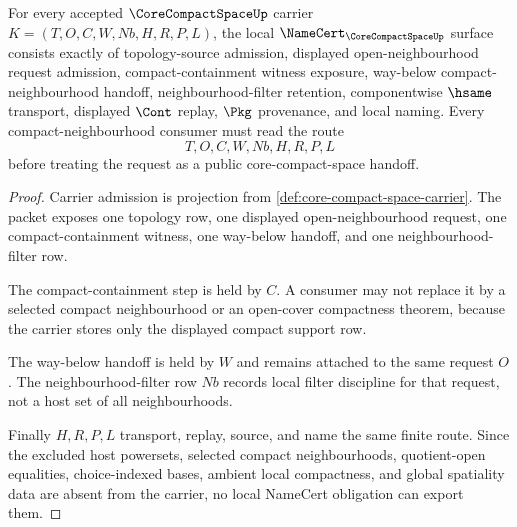 \begin{theorem}
\label{thm:core-compact-space-namecert-obligations}
For every accepted $\CoreCompactSpaceUp$ carrier $K=(T,O,C,W,Nb,H,R,P,L)$, the local $\NameCert_{\CoreCompactSpaceUp}$ surface consists exactly of topology-source admission, displayed open-neighbourhood request admission, compact-containment witness exposure, way-below compact-neighbourhood handoff, neighbourhood-filter retention, componentwise $\hsame$ transport, displayed $\Cont$ replay, $\Pkg$ provenance, and local naming. Every compact-neighbourhood consumer must read the route
$$
T,O,C,W,Nb,H,R,P,L
$$
before treating the request as a public core-compact-space handoff.
\end{theorem}
\begin{proof}
Carrier admission is projection from \autoref{def:core-compact-space-carrier}. The packet exposes one topology row, one displayed open-neighbourhood request, one compact-containment witness, one way-below handoff, and one neighbourhood-filter row.

The compact-containment step is held by $C$. A consumer may not replace it by a selected compact neighbourhood or an open-cover compactness theorem, because the carrier stores only the displayed compact support row.

The way-below handoff is held by $W$ and remains attached to the same request $O$. The neighbourhood-filter row $Nb$ records local filter discipline for that request, not a host set of all neighbourhoods.

Finally $H,R,P,L$ transport, replay, source, and name the same finite route. Since the excluded host powersets, selected compact neighbourhoods, quotient-open equalities, choice-indexed bases, ambient local compactness, and global spatiality data are absent from the carrier, no local NameCert obligation can export them.
\end{proof}

